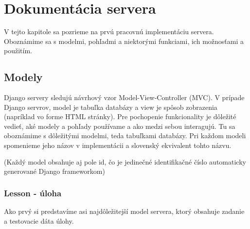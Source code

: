 \chapter{Dokumentácia servera}
\label{kap:doc}



V tejto kapitole sa pozrieme na prvú pracovnú implementáciu servera. Oboznámime sa
s modelmi, pohľadmi a niektorými funkciami, ich možnosťami a použitím.
\section{Modely}
\label{modely}
Django servery sledujú návrhový vzor Model-View-Controller (MVC)\cite{Django}. V prípade Django servrov, model je tabuľka
databázy a view je spôsob zobrazenia (napríklad vo forme HTML stránky). Pre pochopenie
funkcionality je dôležité vedieť, aké modely a pohľady používame a ako medzi sebou interagujú.
\newline
Tu sa oboznámime s dôležitými modelmi, teda tabuľkami databázy.
Pri každom modeli spomenieme jeho názov v implementácii a slovenský ekvivalent tohto názvu.

(Každý model obsahuje aj pole id, čo je jedinečné identifikačné číslo automaticky generované
Django frameworkom)
\subsection{Lesson - úloha}
\label{doc:lesson}
Ako prvý si predstavíme asi najdôležitejší model servera, ktorý obsahuje zadanie a
testovacie dáta úlohy.


